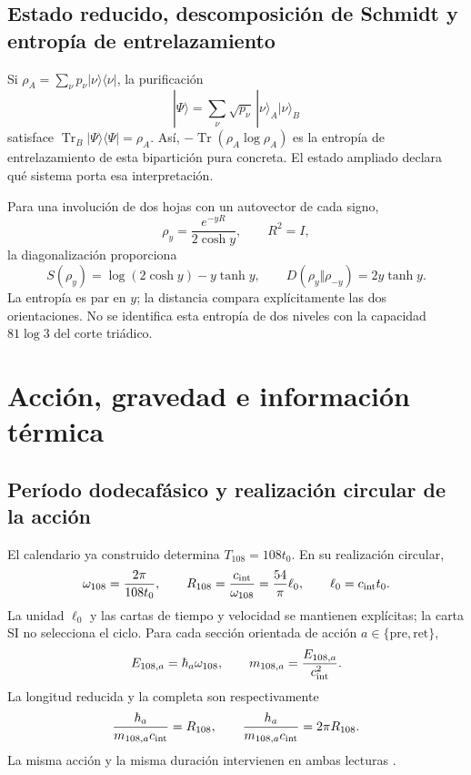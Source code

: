 \documentclass[11pt,a4paper]{article}
\numberwithin{equation}{section}
\theoremstyle{definition}
\newcommand{\Tr}{\operatorname{Tr}}
\begin{document}


\subsection{Estado reducido, descomposición de Schmidt y entropía de entrelazamiento}
Si $\rho_A=\sum_\nu p_\nu|\nu\rangle\langle\nu|$,
la purificación
\[
|\Psi\rangle=\sum_\nu\sqrt{p_\nu}\,
|\nu\rangle_A|\nu\rangle_B
\]
satisface $\Tr_B|\Psi\rangle\langle\Psi|=\rho_A$.
Así, $-\Tr(\rho_A\log\rho_A)$ es la entropía de entrelazamiento
de esta bipartición pura concreta. El estado ampliado declara
qué sistema porta esa interpretación.

Para una involución de dos hojas con un autovector de cada signo,
\[
\rho_y=\frac{e^{-yR}}{2\cosh y},\qquad R^2=I,
\]
la diagonalización proporciona
\[
S(\rho_y)=\log(2\cosh y)-y\tanh y,\qquad
D(\rho_y\Vert\rho_{-y})=2y\tanh y.
\]
La entropía es par en $y$; la distancia compara explícitamente
las dos orientaciones. No se identifica esta entropía de dos niveles
con la capacidad $81\log3$ del corte triádico.

\section{Acción, gravedad e información térmica}
\label{sec:gravity}
\subsection{Período dodecafásico y realización circular de la acción}
El calendario ya construido determina $T_{108}=108t_0$.
En su realización circular,
\[
\omega_{108}=\frac{2\pi}{108t_0},\qquad
R_{108}=\frac{c_{\rm int}}{\omega_{108}}
=\frac{54}{\pi}\ell_0,\qquad \ell_0=c_{\rm int}t_0.
\]
La unidad $\ell_0$ y las cartas de tiempo y velocidad se mantienen
explícitas; la carta SI no selecciona el ciclo.
Para cada sección orientada de acción $a\in\{\mathrm{pre},\mathrm{ret}\}$,
\[
E_{108,a}=\hbar_a\omega_{108},\qquad
m_{108,a}=\frac{E_{108,a}}{c_{\rm int}^2}.
\]
La longitud reducida y la completa son respectivamente
\[
\frac{\hbar_a}{m_{108,a}c_{\rm int}}=R_{108},
\qquad
\frac{h_a}{m_{108,a}c_{\rm int}}=2\pi R_{108}.
\]
La misma acción y la misma duración intervienen en ambas lecturas
\cite{autodual}.
\end{document}
